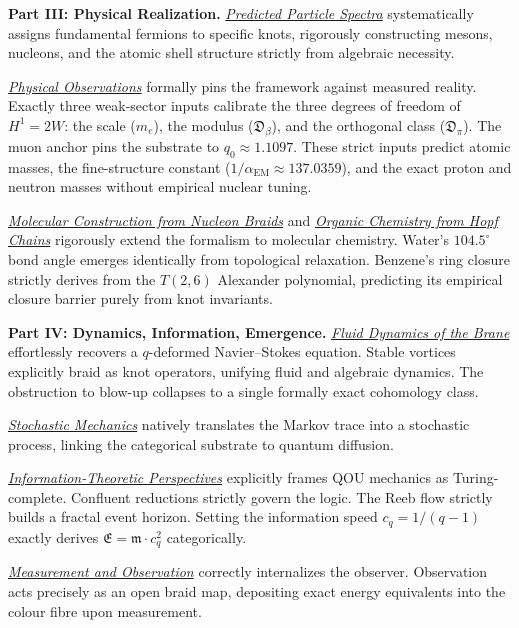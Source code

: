 \textbf{Part III: Physical Realization.}
\hyperref[chap:predicted-spectra]{\emph{Predicted Particle Spectra}} systematically assigns fundamental fermions to specific knots, rigorously constructing mesons, nucleons, and the atomic shell structure strictly from algebraic necessity.

\hyperref[chap:observations]{\emph{Physical Observations}} formally pins the framework against measured reality. Exactly three weak-sector inputs calibrate the three degrees of freedom of $H^1 = 2W$: the scale ($m_e$), the modulus ($\mathfrak{D}_\beta$), and the orthogonal class ($\mathfrak{D}_\pi$). The muon anchor pins the substrate to $q_0 \approx 1.1097$. These strict inputs predict atomic masses, the fine-structure constant ($1/\alpha_{\mathrm{EM}} \approx\allowbreak{} 137.0359$), and the exact proton and neutron masses without empirical nuclear tuning.

\hyperref[chap:molecular-construction]{\emph{Molecular Construction from Nucleon Braids}} and \hyperref[chap:organic-chemistry]{\emph{Organic Chemistry from Hopf Chains}} rigorously extend the formalism to molecular chemistry. Water's $104.5^\circ$ bond angle emerges identically from topological relaxation. Benzene's ring closure strictly derives from the $T(2,6)$ Alexander polynomial, predicting its empirical closure barrier purely from knot invariants.

\textbf{Part IV: Dynamics, Information, Emergence.}
\hyperref[chap:fluid-dynamics]{\emph{Fluid Dynamics of the Brane}} effortlessly recovers a $q$-deformed Navier–Stokes equation. Stable vortices explicitly braid as knot operators, unifying fluid and algebraic dynamics. The obstruction to blow-up collapses to a single formally exact cohomology class.

\hyperref[chap:stochastic-mechanics]{\emph{Stochastic Mechanics}} natively translates the Markov trace into a stochastic process, linking the categorical substrate to quantum diffusion.

\hyperref[chap:info-theory]{\emph{Information-Theoretic Perspectives}} explicitly frames QOU mechanics as Turing-complete. Confluent reductions strictly govern the logic. The Reeb flow strictly builds a fractal event horizon. Setting the information speed $c_q = 1/(q - 1)$ exactly derives $\mathfrak{E} =\allowbreak{} \mathfrak{m} \cdot c_q^{2}$ categorically.

\hyperref[chap:measurement-observation]{\emph{Measurement and Observation}} correctly internalizes the observer. Observation acts precisely as an open braid map, depositing exact energy equivalents into the colour fibre upon measurement.


